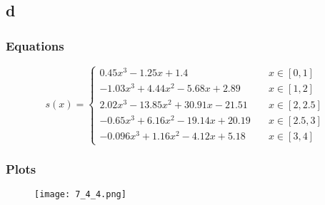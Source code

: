 \documentclass{article}
\begin{document}
\newpage
\subsection{d}
\subsubsection{Equations}
$$
s(x) = \left\{
        \begin{array}{ll}
            0.45 x^{3} - 1.25 x + 1.4 & \quad x \in [0,1] \\
            - 1.03 x^{3} + 4.44 x^{2} - 5.68 x + 2.89 & \quad x\in [1,2]\\
            2.02 x^{3} - 13.85 x^{2} + 30.91 x - 21.51 & \quad x \in [2,2.5] \\
            - 0.65 x^{3} + 6.16 x^{2} - 19.14 x + 20.19 & \quad x\in [2.5,3] \\
            - 0.096 x^{3} + 1.16 x^{2} - 4.12 x + 5.18 & \quad x\in [3,4] 
        \end{array}
    \right.
$$

\subsubsection{Plots}
\begin{figure}[H]
\centering
\texttt{[image: 7\_4\_4.png]}
\caption{}
\end{figure}
\end{document}
